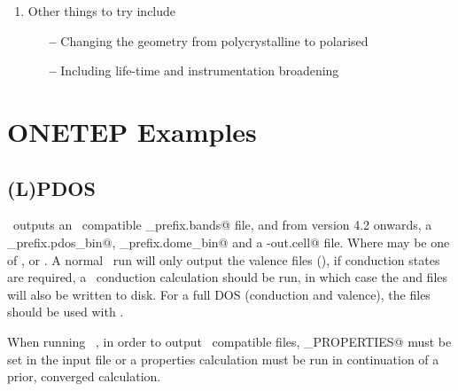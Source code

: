 \documentclass[a4paper,11pt,twoside]{book}
\begin{document}
{\begin{enumerate}
\begin{verbatim}
     %BLOCK POSITIONS_FRAC
            Si:exi    0.0000000000    0.0000000000    0.0000000000
            Si        0.5000000000    0.5000000000    0.0000000000  
            Si        0.5000000000    0.0000000000    0.5000000000
            Si        0.0000000000    0.5000000000    0.5000000000
            Si        0.2500000000    0.2500000000    0.2500000000
            Si        0.7500000000    0.2500000000    0.7500000000
            Si        0.2500000000    0.7500000000    0.7500000000
            Si        0.7500000000    0.7500000000    0.2500000000
      %ENDBLOCK POSITIONS_FRAC
\end{verbatim}
Run \optados\ and compare the spectrum from the face-centred unit cell with that from the primitive unit cell.  Continue constructing larger unit cells until the core-hole spectrum stops changing with increasing separation between the periodic images.  

\item Other things to try include
\begin{itemize}
\item[{\bf --}] Changing the geometry from polycrystalline to polarised
\item[{\bf --}] Including life-time and instrumentation broadening
\end{itemize}
\end{enumerate}

\chapter{ONETEP Examples}
\section{(L)PDOS}
\onetep\ outputs an \optados\ compatible \verb@seedname_prefix.bands@ file, and from version 4.2 onwards, a \verb@seedname_prefix.pdos_bin@, \verb@seedname_prefix.dome_bin@ and a \verb@seedname-out.cell@ file. Where \verb@prefix@ may be one of \verb@val@, \verb@cond@ or \verb@joint@. 
%
A normal \onetep\  run will only output the valence files (\verb@val@), if conduction states are required, a \onetep\  conduction calculation should be run, in which case the \verb@cond@ and \verb@joint@ files will also be written to disk. 
%
For a full DOS (conduction and valence), the \verb@joint@ files should be used with \optados.

When running \onetep\ , in order to output \optados\ compatible files, \verb@DO_PROPERTIES@ must be set in the input file or a properties calculation must be run in continuation of a prior, converged calculation.

}
\end{document}
